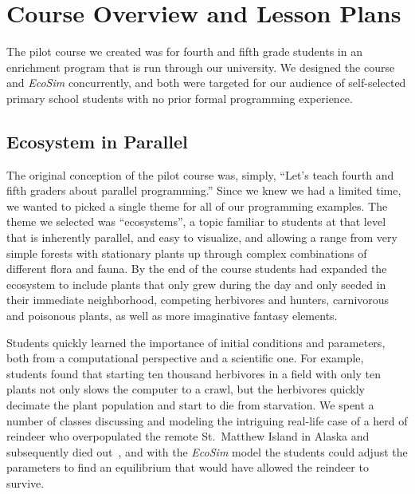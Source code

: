 \documentclass{sig-alternate}
\begin{document}
\section{Course Overview and Lesson Plans}
The pilot course we created was for fourth and fifth grade students in an enrichment program
that is run through our university.  We designed the course and \emph{EcoSim} concurrently,
and both were targeted for our audience of self-selected primary school students with no
prior formal programming experience.

\subsection{Ecosystem in Parallel}
The original conception of the pilot course was, simply, 
``Let's teach fourth and fifth graders about parallel programming.''
Since we knew we had a limited time, we wanted to picked a single theme for all of our programming examples.
The theme we selected was ``ecosystems'', a topic familiar to students at that level
that is inherently parallel, and easy to visualize, 
and allowing a range from very simple forests with stationary plants 
up through complex combinations of different flora and fauna.
By the end of the course students had expanded the ecosystem 
to include plants that only grew during the day and only seeded in their immediate neighborhood,
competing herbivores and hunters, carnivorous and poisonous plants,
as well as more imaginative fantasy elements.

Students quickly learned the importance of initial conditions and parameters, both from a 
computational perspective and a scientific one.  For example, students found that starting 
ten thousand herbivores in a field with only ten plants
not only slows the computer to a crawl, but the herbivores quickly decimate the plant population
and start to die from starvation.  We spent a number of classes discussing and
modeling the intriguing real-life case of a herd of reindeer who overpopulated the remote
St.~Matthew Island in Alaska and subsequently died out~\cite{klein1968introduction,stMatthewIsland}, 
and with the \emph{EcoSim} model the students could adjust the parameters to find an
equilibrium that would have allowed the reindeer to survive.
\end{document}
